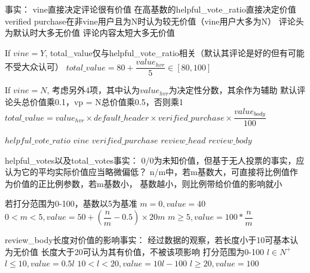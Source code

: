 


事实：
vine直接决定评论很有价值
在高基数的helpful_vote_ratio直接决定价值
verified purchase在非vine用户且为N时认为较无价值（vine用户大多为N）
评论头为默认时大多无价值
评论内容太短大多无价值

If $vine = Y$, total_value仅与helpful_vote_ratio相关（默认其评论是好的但有可能不受大众认可）
$total\_value = 80 + \dfrac{value_{hvr}}{5} \in [80, 100]$

If $vine = N$, 考虑另外4项，其中认为$value_{hvr}$为决定性分数，其余作为辅助
默认评论头总价值乘0.1，vp = N总价值乘0.5，否则乘1
$total\_value = value_{hvr} \times default\_header \times verified\_purchase \times \dfrac{value_{body}}{100} $


$helpful\_vote\_ratio$
$vine$
$verified\_purchase$
$review\_head$
$review\_body$

helpful_votes以及total_votes事实：
0/0为未知价值，但基于无人投票的事实，应认为它的平均实际价值应当略微偏低？
n/m中，若m基数大，可直接将比例值作为价值的正比例参数，若m基数小，
基数越小，则比例带给价值的影响就小

若打分范围为0-100，基数以5为基准
$m = 0, value = 40$
$0 < m < 5, value = 50 + (\dfrac{n}{m} - 0.5) \times 20m$
$m \geq 5, value = 100 * \dfrac{n}{m}$


review_body长度对价值的影响事实：
经过数据的观察，若长度小于10可基本认为无价值
长度大于20可认为其有价值，不被该项影响
打分范围为0-100
$l \in N^+$
$l \leq 10, value = 0.5l$
$10 < l < 20, value = 10l - 100$
$l \geq 20, value = 100$
